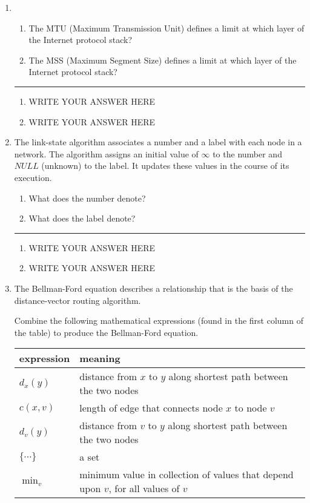 \documentclass[twoside]{article}
\newenvironment{answer}
  {\vspace*{0.2cm} \rule{12cm}{0.04cm} \vspace*{0.2cm}}
  {\vspace*{0.2cm}}
\begin{document}
\begin{enumerate}
  \item 
  \begin{enumerate}
    \item The MTU (Maximum Transmission Unit) defines a limit at which
      layer of the Internet protocol stack?
    \item The MSS (Maximum Segment Size) defines a limit at which
      layer of the Internet protocol stack?
    \end{enumerate}

  \begin{answer}

  \begin{enumerate}
    \item WRITE YOUR ANSWER HERE
    \item WRITE YOUR ANSWER HERE
    \end{enumerate}

    \end{answer}

  \item The link-state algorithm associates a number and a label with
    each node in a network. The algorithm assigns an initial value
    of $\infty$ to the number and $NULL$ (unknown) to the label.
    It updates these values in the course of its execution.
  \begin{enumerate}
    \item What does the number denote?
    \item What does the label denote?
    \end{enumerate}
  
  \begin{answer}

  \begin{enumerate}
    \item WRITE YOUR ANSWER HERE
    \item WRITE YOUR ANSWER HERE
    \end{enumerate}

    \end{answer}

  \item The Bellman-Ford equation describes a relationship that
    is the basis of the distance-vector routing algorithm.

    Combine the following mathematical expressions
    (found in the first column of the table) to produce the Bellman-Ford equation.

  \begin{tabular}{ll}
    \textbf{expression} & \textbf{meaning} \\ \hline
    $d_x(y)$ & distance from $x$ to $y$ along shortest path between the two nodes\\
    $c(x,v)$ & length of edge that connects node $x$ to node $v$ \\
    $d_v(y)$ & distance from $v$ to $y$ along shortest path between the two nodes \\
    $\{ \cdots \}$ & a set \\
    ${\min}_v$ & \parbox[t]{10cm}{minimum value in collection of values that
      depend upon $v$, for all values of $v$}
    \end{tabular}


\end{enumerate}
\end{document}
